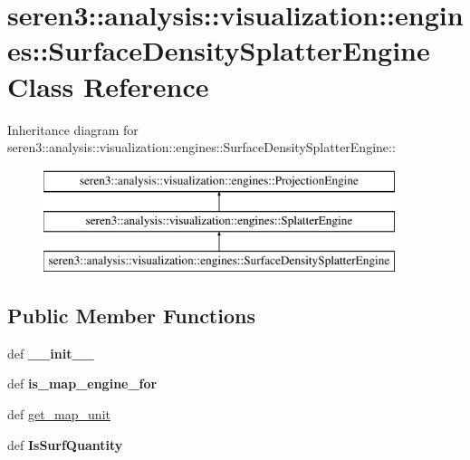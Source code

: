 \hypertarget{classseren3_1_1analysis_1_1visualization_1_1engines_1_1SurfaceDensitySplatterEngine}{
\section{seren3::analysis::visualization::engines::SurfaceDensitySplatterEngine Class Reference}
\label{classseren3_1_1analysis_1_1visualization_1_1engines_1_1SurfaceDensitySplatterEngine}
}
Inheritance diagram for seren3::analysis::visualization::engines::SurfaceDensitySplatterEngine::\begin{figure}[H]
\begin{center}
\leavevmode
\includegraphics[height=3cm]{classseren3_1_1analysis_1_1visualization_1_1engines_1_1SurfaceDensitySplatterEngine}
\end{center}
\end{figure}
\subsection*{Public Member Functions}
\begin{DoxyCompactItemize}
\item 
\hypertarget{classseren3_1_1analysis_1_1visualization_1_1engines_1_1SurfaceDensitySplatterEngine_aa85b1283943959910799b89c864a2ea8}{
def {\bfseries \_\-\_\-init\_\-\_\-}}
\label{classseren3_1_1analysis_1_1visualization_1_1engines_1_1SurfaceDensitySplatterEngine_aa85b1283943959910799b89c864a2ea8}

\item 
\hypertarget{classseren3_1_1analysis_1_1visualization_1_1engines_1_1SurfaceDensitySplatterEngine_a0347f5c89b8696774cc91958b232daa5}{
def {\bfseries is\_\-map\_\-engine\_\-for}}
\label{classseren3_1_1analysis_1_1visualization_1_1engines_1_1SurfaceDensitySplatterEngine_a0347f5c89b8696774cc91958b232daa5}

\item 
def \hyperlink{classseren3_1_1analysis_1_1visualization_1_1engines_1_1SurfaceDensitySplatterEngine_ae2e4c1095a51c7cfeab0eebdcae10e37}{get\_\-map\_\-unit}
\item 
\hypertarget{classseren3_1_1analysis_1_1visualization_1_1engines_1_1SurfaceDensitySplatterEngine_ad5319f18f28fb978a8dbd4b5e93717df}{
def {\bfseries IsSurfQuantity}}
\label{classseren3_1_1analysis_1_1visualization_1_1engines_1_1SurfaceDensitySplatterEngine_ad5319f18f28fb978a8dbd4b5e93717df}

\end{DoxyCompactItemize}


